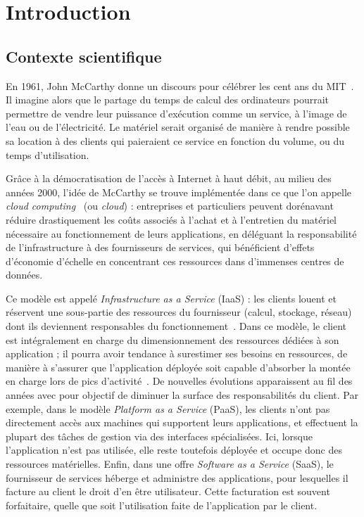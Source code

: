 \chapter{Introduction}
\label{chapter:introduction}

\section{Contexte scientifique}

En 1961, John McCarthy donne un discours pour célébrer les cent ans du MIT~\cite{greenberger1962management}. Il imagine alors que le partage du temps de calcul des ordinateurs pourrait permettre de vendre leur puissance d'exécution comme un service, à l'image de l'eau ou de l'électricité. Le matériel serait organisé de manière à rendre possible sa location à des clients qui paieraient ce service en fonction du volume, ou du temps d'utilisation.

Grâce à la démocratisation de l'accès à Internet à haut débit, au milieu des années 2000, l'idée de McCarthy se trouve implémentée dans ce que l'on appelle \textit{cloud computing}~\cite{hayesCloudComputing2008} (ou \textit{cloud}) : entreprises et particuliers peuvent dorénavant réduire drastiquement les coûts associés à l'achat et à l'entretien du matériel nécessaire au fonctionnement de leurs applications, en déléguant la responsabilité de l'infrastructure à des fournisseurs de services, qui bénéficient d'effets d'économie d'échelle en concentrant ces ressources dans d'immenses centres de données.

Ce modèle est appelé \textit{Infrastructure as a Service} (IaaS) : les clients louent et réservent une sous-partie des ressources du fournisseur (calcul, stockage, réseau) dont ils deviennent responsables du fonctionnement~\cite{mellNISTDefinitionCloud}. Dans ce modèle, le client est intégralement en charge du dimensionnement des ressources dédiées à son application ; il pourra avoir tendance à surestimer ses besoins en ressources, de manière à s'assurer que l'application déployée soit capable d'absorber la montée en charge lors de pics d'activité~\cite{takMoveNotMove}. De nouvelles évolutions apparaissent au fil des années avec pour objectif de diminuer la surface des responsabilités du client. Par exemple, dans le modèle \textit{Platform as a Service} (PaaS), les clients n'ont pas directement accès aux machines qui supportent leurs applications, et effectuent la plupart des tâches de gestion via des interfaces spécialisées. Ici, lorsque l'application n'est pas utilisée, elle reste toutefois déployée et occupe donc des ressources matérielles. Enfin, dans une offre \textit{Software as a Service} (SaaS), le fournisseur de services héberge et administre des applications, pour lesquelles il facture au client le droit d'en être utilisateur. Cette facturation est souvent forfaitaire, quelle que soit l'utilisation faite de l'application par le client.

